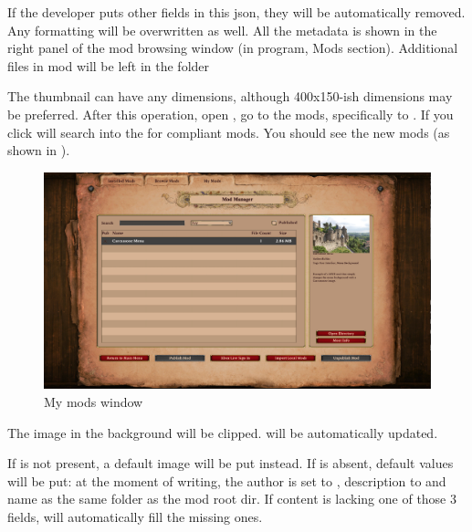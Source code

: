 If the developer puts other fields in this json, they will be automatically removed. Any formatting will be overwritten as well.
All the metadata is shown in the right panel of the mod browsing window (in \aoe{} program, Mods section). Additional files in \aoehomelocaldir{} mod will be left in the folder



The thumbnail can have any dimensions, although 400x150-ish dimensions may be preferred.
After this operation, open \aoe{}, go to the mods, specifically to . If you click  \aoe{} will search into the \aoehomelocaldir{} for compliant mods. You should see the new mods (as shown in ).

\begin{figure}[ht]
    \centering
    \includegraphics[width=1.0\textwidth]{src/images/mymods}
    \caption{My mods window}
    \label{fig:mymods}
\end{figure}

The image in the background will be clipped.  will be automatically updated.

\begin{warning}
    If  is not present, a default image will be put instead. If  is absent, default values will be put: at the moment of writing, the author is set to , description to  and name as the same folder as the mod root dir. If  content is lacking one of those 3 fields, \aoe{} will automatically fill the missing ones.
\end{warning}

